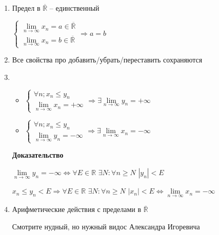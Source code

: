 \documentclass[14pt, letter paper]{article}
\begin{document}
\begin{enumerate}
    \item Предел в $\overline{\mathds{R}}$ -- единственный

    $\begin{cases}
        \lim\limits_{n \rightarrow \infty}{x_n} = a \in \overline{\mathds{R}} \\
        \lim\limits_{n \rightarrow \infty}{x_n} = b \in \overline{\mathds{R}}
    \end{cases} \Rightarrow a = b$

    \item Все свойства про добавить/убрать/переставить сохраняются

    \item \begin{itemize}
        \item $\begin{cases}
            \forall n; x_n \leq y_n \\
            \lim\limits_{n \rightarrow \infty}{x_n} = + \infty
        \end{cases} \Rightarrow \exists \lim\limits_{n \rightarrow \infty}{y_n} = + \infty$

        \item $\begin{cases}
            \forall n; x_n \leq y_n \\
            \lim\limits_{n \rightarrow \infty}{y_n} = -\infty
        \end{cases} \Rightarrow \exists \lim\limits_{n \rightarrow \infty}{x_n} = - \infty$
    \end{itemize}
    
    \begin{center}
        \textbf{Доказательство}
    \end{center}

    $\lim\limits_{n \rightarrow \infty}{y_n} = -\infty \Leftrightarrow \forall E \in \mathds{R}$ $\exists N : \forall n \geq N$ $|y_n| < E$

    $x_n \leq y_n < E \Rightarrow \forall E \in \mathds{R}$ $\exists N: \forall n \geq N$ $|x_n| < E \Leftrightarrow \lim\limits_{n \rightarrow \infty}{x_n} = -\infty$

    \item Арифметические действия с пределами в $\overline{\mathds{R}}$

    Смотрите нудный, но нужный видос Александра Игоревича
\end{enumerate}
\end{document}
